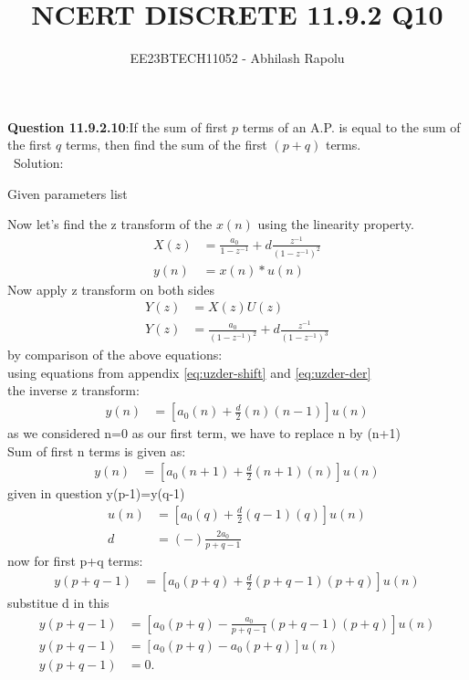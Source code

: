 \documentclass[journal,12pt,twocolumn]{IEEEtran}
\title{NCERT DISCRETE 11.9.2 Q10}
\author{EE23BTECH11052 - Abhilash Rapolu }
\begin{document}
\maketitle
\newpage
\textbf{Question 11.9.2.10}:If the sum of first $p$ terms of an A.P. is equal to the sum of the first $q$ terms, then
find the sum of the first $(p + q)$ terms.\\
\ Solution:
\fi
\begin{table}[htbp]
\centering

\caption{Given parameters list}
\end{table}
Now let's find the z transform of the $x(n)$ using the linearity property.\\
\begin{align}
X(z)&=\frac{a_0}{1-z^{-1}}+d\frac{z^{-1}}{(1-z^{-1})^2}\\
y(n) &= x(n)*u(n)
\end{align}
Now apply z transform on both sides\\
\begin{align}
Y(z)&=X(z)U(z)\\
Y(z)&=\frac{a_0}{(1-z^{-1})^2}+d\frac{z^{-1}}{(1-z^{-1})^3}
\end{align}
by comparison of the above equations:\\
using equations from appendix  \eqref{eq:uzder-shift} and \eqref{eq:uzder-der}\\
the inverse z transform:\\
\begin{align}
y(n)&=[a_0(n)+\frac{d}{2}(n)(n-1)]u(n)
\end{align}
as we considered n=0 as our first term, we have to replace n by (n+1)\\
Sum of first n terms is given as:\\
\begin{align}
y(n)&=[a_0(n+1)+\frac{d}{2}(n+1)(n)]u(n)
\end{align}
given in question y(p-1)=y(q-1)\\
\begin{align}
[a_0(p)+\frac{d}{2}(p-1)(p)]u(n)&=[a_0(q)+\frac{d}{2}(q-1)(q)]u(n)\\
d&=(-)\frac{2a_0}{p+q-1}
\end{align}
now for first p+q terms:\\
\begin{align}
y(p+q-1)&=[a_0(p+q)+\frac{d}{2}(p+q-1)(p+q)]u(n)
\end{align}
substitue d in this\\
\begin{align}
y(p+q-1)&=[a_0(p+q)-\frac{a_0}{p+q-1}(p+q-1)(p+q)]u(n)\\
y(p+q-1)&=[a_0(p+q)-a_0(p+q)]u(n)\\
y(p+q-1)&=0.
\end{align}

\end{document}
